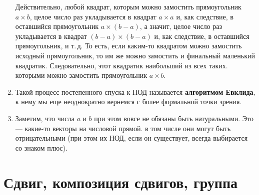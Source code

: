 \begin{enumerate}
Действительно, любой квадрат, которым можно замостить прямоугольник $a\times b$, целое число раз укладывается в квадрат $a\times a$ и, как следствие, в оставшийся прямоугольник $a\times(b-a)$, а значит, целое число раз укладывается в квадрат $(b-a)\times (b-a)$ и, как следствие, в оставшийся прямоугольник, и т.\,д. То есть, если каким-то квадратом можно замостить исходный прямоугольник, то им же можно замостить и финальный маленький квадратик. Следовательно, этот квадратик наибольший из всех таких. которыми можно замостить прямоугольник $a\times b$.
\item Такой процесс постепенного спуска к НОД называется \textbf{алгоритмом Евклида}, к нему мы еще неоднократно вернемся с более формальной точки зрения.
\item Заметим, что числа $a$ и $b$ при этом вовсе не обязаны быть натуральными. Это --- какие-то векторы на числовой прямой. в том числе они могут быть отрицательными (при этом их НОД, если он существует, всегда выбирается со знаком плюс).
\end{enumerate}

\section{Сдвиг, композиция сдвигов, группа}



